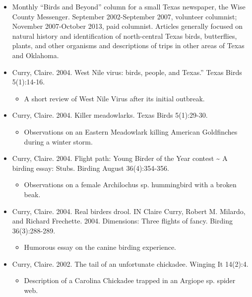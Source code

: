 \documentclass[
  letterpaper,
  DIV=11,
  numbers=noendperiod,
  oneside]{scrreprt}
\providecommand{\tightlist}{%
  \setlength{\itemsep}{0pt}\setlength{\parskip}{0pt}}\usepackage{longtable,booktabs,array}
\begin{document}
\begin{itemize}
\tightlist
\item
  Monthly ``Birds and Beyond'' column for a small Texas newspaper, the
  Wise County Messenger. September 2002-September 2007, volunteer
  columnist; November 2007-October 2013, paid columnist. Articles
  generally focused on natural history and identification of
  north-central Texas birds, butterflies, plants, and other organisms
  and descriptions of trips in other areas of Texas and Oklahoma.
\item
  Curry, Claire. 2004. West Nile virus: birds, people, and Texas.''
  Texas Birds 5(1):14-16.

  \begin{itemize}
  \tightlist
  \item
    A short review of West Nile Virus after its initial outbreak.
  \end{itemize}
\item
  Curry, Claire. 2004. Killer meadowlarks. Texas Birds 5(1):29-30.

  \begin{itemize}
  \tightlist
  \item
    Observations on an Eastern Meadowlark killing American Goldfinches
    during a winter storm.
  \end{itemize}
\item
  Curry, Claire. 2004. Flight path: Young Birder of the Year contest
  \textasciitilde{} A birding essay: Stubs. Birding August
  36(4):354-356.

  \begin{itemize}
  \tightlist
  \item
    Observations on a female Archilochus sp. hummingbird with a broken
    beak.
  \end{itemize}
\item
  Curry, Claire. 2004. Real birders drool. IN Claire Curry, Robert M.
  Milardo, and Richard Frechette. 2004. Dimensions: Three flights of
  fancy. Birding 36(3):288-289.

  \begin{itemize}
  \tightlist
  \item
    Humorous essay on the canine birding experience.
  \end{itemize}
\item
  Curry, Claire. 2002. The tail of an unfortunate chickadee. Winging It
  14(2):4.

  \begin{itemize}
  \tightlist
  \item
    Description of a Carolina Chickadee trapped in an Argiope sp. spider
    web.
  \end{itemize}
\end{itemize}
\end{document}
